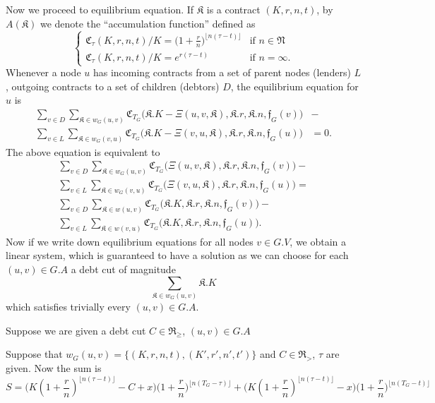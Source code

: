 \documentclass[10pt]{article}
\newcommand{\RR}{\mathfrak{R}}
\newcommand{\KK}{\mathfrak{K}}
\newcommand{\CC}{\mathfrak{C}}
\newcommand{\ff}{\mathfrak{f}}
\begin{document}
Now we proceed to equilibrium equation. If $\mathfrak{K}$ is a contract $(K, r, n, t)$, by $A(\mathfrak{K})$ we denote the ``accumulation function'' defined as 
\[
\begin{cases}
\mathfrak{C}_{\tau}(K, r, n, t) / K = \big( 1 + \frac{r}{n}\big)^{\lfloor n(\tau - t) \rfloor} & \mbox{if } n \in \mathfrak{N} \\
\mathfrak{C}_{\tau}(K, r, n, t) / K = e^{r(\tau - t)} & \mbox{if } n = \infty.
\end{cases}
\]
Whenever a node $u$ has incoming contracts from a set of parent nodes (lenders) $L$, outgoing contracts to a set of children (debtors) $D$, the equilibrium equation for $u$ is
\begin{equation}
\begin{aligned}
\sum_{v \in D} \sum_{\KK \in w_G(u, v)} \CC_{T_G} \big( \KK.K - \Xi(u, v, \KK), \KK.r, \KK.n, \ff_G(v) \big ) & - \\ 
\sum_{v \in L} \sum_{\KK \in w_G(v, u)} \CC_{T_G} \big( \KK.K - \Xi(v, u, \KK), \KK.r, \KK.n, \ff_G(u) \big) & = 0.
\end{aligned}
\end{equation}
The above equation is equivalent to
\begin{equation}
\begin{aligned}
& \sum_{v \in D} \sum_{\KK \in w_G(u, v)} \CC_{T_G} \big( \Xi(u, v, \KK), \KK.r, \KK.n, \ff_G(v) \big) - \\
& \sum_{v \in L} \sum_{\KK \in w_G(v, u)} \CC_{T_G} \big( \Xi(v, u, \KK), \KK.r, \KK.n, \ff_G(u) \big) = \\
& \sum_{v \in D} \sum_{\KK \in w(u, v)} \CC_{T_G} \big( \KK.K, \KK.r, \KK.n, \ff_G(v) \big) - \\
& \sum_{v \in L} \sum_{\KK \in w(v, u)} \CC_{T_G} \big( \KK.K, \KK.r, \KK.n, \ff_G(u) \big). &
\end{aligned}
\end{equation}
Now if we write down equilibrium equations for all nodes $v \in G.V$, we obtain a linear system, which is guaranteed to have a solution as we can choose for each $(u, v) \in G.A$ a debt cut of magnitude 
\[
\sum_{\KK \in w_G(u, v)} \KK.K
\]
which satisfies trivially every $(u, v) \in G.A$.

Suppose we are given a debt cut $C \in \RR_{\geq}$, $(u, v) \in G.A$

Suppose that $w_G(u, v) = \{ (K, r, n, t), (K', r', n', t') \}$ and $C \in \RR_>$, $\tau$ are given. Now the sum is 
\[
S =\Big( K(1 + \frac{r}{n})^{ \lfloor n ( \tau - t ) \rfloor } - C + x \Big) \Big( 1 + \frac{r}{n} \Big)^{ \lfloor n ( T_G - \tau ) \rfloor } +
\Big( K(1 + \frac{r}{n})^{ \lfloor n ( \tau - t ) \rfloor  } - x\Big) \Big( 1 + \frac{r}{n} \Big)^{ \lfloor n ( T_G - t ) \rfloor }
\]
\end{document}
